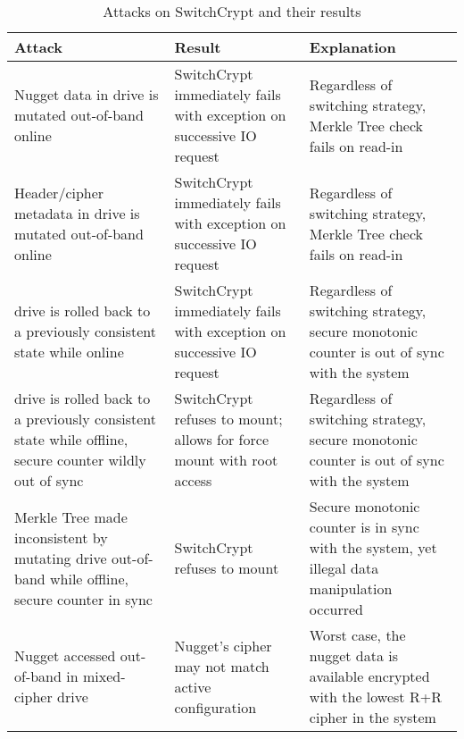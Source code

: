 \begin{table}[t]
  \caption{Attacks on SwitchCrypt and their results} \label{tbl:security}
  \footnotesize
  \centering
  \begin{tabu} to \linewidth { | X[l] | X[c] | X[c] | }
    \hline
    \textbf{Attack} & \textbf{Result} & \textbf{Explanation} \\
    \hline\hline
    Nugget data in drive is mutated out-of-band online & SwitchCrypt immediately
    fails with exception on successive IO request & Regardless of switching
    strategy, Merkle Tree check fails on read-in\\
    \hline
    Header/cipher metadata in drive is mutated out-of-band online & SwitchCrypt
    immediately fails with exception on successive IO request & Regardless of
    switching strategy, Merkle Tree check fails on read-in\\
    \hline
    drive is rolled back to a previously consistent state while online &
    SwitchCrypt immediately fails with exception on successive IO request &
    Regardless of switching strategy, secure monotonic counter is out of sync
    with the system\\
    \hline
    drive is rolled back to a previously consistent state while offline, secure
    counter wildly out of sync & SwitchCrypt refuses to mount; allows for force
    mount with root access & Regardless of switching strategy, secure monotonic
    counter is out of sync with the system\\
    \hline
    Merkle Tree made inconsistent by mutating drive out-of-band while offline,
    secure counter in sync & SwitchCrypt refuses to mount & Secure monotonic
    counter is in sync with the system, yet illegal data manipulation occurred\\
    \hline
    Nugget accessed out-of-band in mixed-cipher drive & Nugget's cipher may not
    match active configuration & Worst case, the nugget data is available
    encrypted with the lowest R+R cipher in the system\\
    \hline\hline
  \end{tabu}
\end{table}
